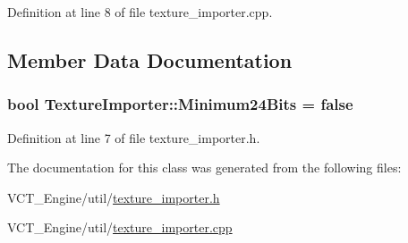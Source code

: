 Definition at line 8 of file texture\+\_\+importer.\+cpp.



\subsection{Member Data Documentation}
\hypertarget{class_texture_importer_a771ef6083f288138f236076f5fbc9ef7}{}
\subsubsection[{Minimum24\+Bits}]{\setlength{\rightskip}{0pt plus 5cm}bool Texture\+Importer\+::\+Minimum24\+Bits = false\hspace{0.3cm}{\ttfamily [static]}}\label{class_texture_importer_a771ef6083f288138f236076f5fbc9ef7}


Definition at line 7 of file texture\+\_\+importer.\+h.



The documentation for this class was generated from the following files\+:\begin{DoxyCompactItemize}
\item 
V\+C\+T\+\_\+\+Engine/util/\hyperlink{texture__importer_8h}{texture\+\_\+importer.\+h}\item 
V\+C\+T\+\_\+\+Engine/util/\hyperlink{texture__importer_8cpp}{texture\+\_\+importer.\+cpp}\end{DoxyCompactItemize}

